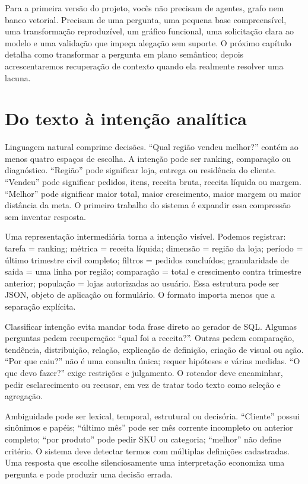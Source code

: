 Para a primeira versão do projeto, vocês não precisam de agentes, grafo nem banco vetorial. Precisam de uma pergunta, uma pequena base compreensível, uma transformação reproduzível, um gráfico funcional, uma solicitação clara ao modelo e uma validação que impeça alegação sem suporte. O próximo capítulo detalha como transformar a pergunta em plano semântico; depois acrescentaremos recuperação de contexto quando ela realmente resolver uma lacuna.

\section{Do texto à intenção analítica}

Linguagem natural comprime decisões. ``Qual região vendeu melhor?'' contém ao menos quatro espaços de escolha. A intenção pode ser ranking, comparação ou diagnóstico. ``Região'' pode significar loja, entrega ou residência do cliente. ``Vendeu'' pode significar pedidos, itens, receita bruta, receita líquida ou margem. ``Melhor'' pode significar maior total, maior crescimento, maior margem ou maior distância da meta. O primeiro trabalho do sistema é expandir essa compressão sem inventar resposta.

Uma representação intermediária torna a intenção visível. Podemos registrar: tarefa = ranking; métrica = receita líquida; dimensão = região da loja; período = último trimestre civil completo; filtros = pedidos concluídos; granularidade de saída = uma linha por região; comparação = total e crescimento contra trimestre anterior; população = lojas autorizadas ao usuário. Essa estrutura pode ser JSON, objeto de aplicação ou formulário. O formato importa menos que a separação explícita.

Classificar intenção evita mandar toda frase direto ao gerador de SQL. Algumas perguntas pedem recuperação: ``qual foi a receita?''. Outras pedem comparação, tendência, distribuição, relação, explicação de definição, criação de visual ou ação. ``Por que caiu?'' não é uma consulta única; requer hipóteses e várias medidas. ``O que devo fazer?'' exige restrições e julgamento. O roteador deve encaminhar, pedir esclarecimento ou recusar, em vez de tratar todo texto como seleção e agregação.

Ambiguidade pode ser lexical, temporal, estrutural ou decisória. ``Cliente'' possui sinônimos e papéis; ``último mês'' pode ser mês corrente incompleto ou anterior completo; ``por produto'' pode pedir SKU ou categoria; ``melhor'' não define critério. O sistema deve detectar termos com múltiplas definições cadastradas. Uma resposta que escolhe silenciosamente uma interpretação economiza uma pergunta e pode produzir uma decisão errada.

